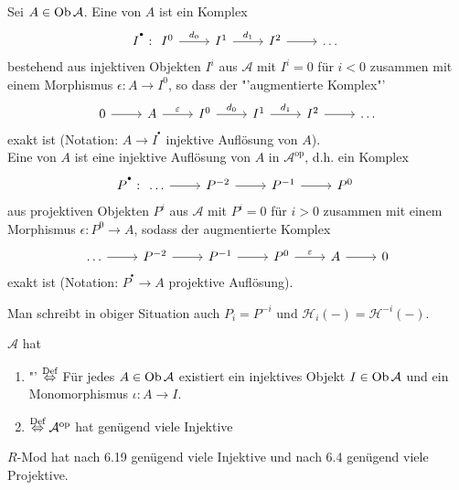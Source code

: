 \begin{df}\label{7.5}
	Sei $A\in \text{Ob}\,\mathcal{A}$. Eine  von $A$ ist ein Komplex 
	$$I^{^\bullet}: \begin{tikzcd}
	I^0\arrow{r}{d_0} & I^1 \arrow{r}{d_1}& I^2\arrow{r} & \ldots
	\end{tikzcd}$$
	bestehend aus injektiven Objekten $I^i$ aus $\mathcal{A}$ mit $I^i=0$ für $i<0$ zusammen mit einem Morphismus $\epsilon : A\longrightarrow I^0$, so dass der "'augmentierte Komplex"'
	$$\begin{tikzcd}
	0 \arrow{r}& A \arrow{r}{\epsilon} &I^0\arrow{r}{d_0} & I^1 \arrow{r}{d_1}& I^2\arrow{r} & \ldots
	\end{tikzcd}$$
	exakt ist (Notation: $A\longrightarrow I^{^\bullet}$ injektive Auflösung von $A$).\\
	Eine  von $A$ ist eine injektive Auflösung von $A$ in $\mathcal{A}^\text{op}$, d.h. ein Komplex 
	$$P^{^\bullet}: \begin{tikzcd}
	\ldots \arrow{r} &P^{-2} \arrow{r} & P^{-1} \arrow{r} & P^0
	\end{tikzcd}$$
	aus projektiven Objekten $P^i$ aus $\mathcal{A}$ mit $P^i=0$ für $i>0$ zusammen mit einem Morphismus $\epsilon:P^0 \to A$, sodass der augmentierte Komplex
	$$\begin{tikzcd}
	\ldots \arrow{r} & P^{-2} \arrow{r} &P^{-1} \arrow{r} & P^0 \arrow{r}{\epsilon} & A \arrow{r} & 0
		\end{tikzcd}$$
	exakt ist (Notation: $P^{^\bullet} \longrightarrow A$ projektive Auflösung).
\end{df}
\begin{anm}
	Man schreibt in obiger Situation auch $P_i = P^{-i}$ und $\mathcal{H}_i(-) = \mathcal{H}^{-i}(-)$.
\end{anm}
\begin{df}
	$\mathcal{A}$ hat
	\begin{enumerate}
		\item[] "' $\overset{\text{Def}}{\Leftrightarrow}$ Für jedes $A\in \text{Ob}\,\mathcal{A}$ existiert ein injektives Objekt $I\in \text{Ob}\,\mathcal{A}$ und ein Monomorphismus $\iota:A \to I$.
		\item[]   $\overset{\text{Def}}{\Leftrightarrow} \mathcal{A}^\text{op}$ hat genügend viele Injektive
	\end{enumerate}
\end{df}
\begin{bsp}
	$R$-Mod hat nach 6.19 genügend viele Injektive und nach 6.4 genügend viele Projektive.
\end{bsp}
